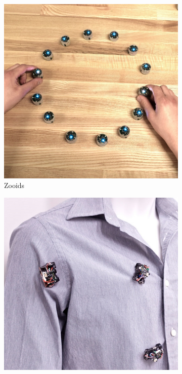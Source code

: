 \newpage

\begin{figure}
	\begin{subfigure}[b]{0.32\textwidth}
		\includegraphics[width=\textwidth]{pics/zooids.jpg}
		\caption{Zooids~\cite{legoc_uist_2016}}
		\label{fig:int_zooids}
	\end{subfigure}
	\begin{subfigure}[b]{0.324\textwidth}
		\includegraphics[width=\textwidth]{pics/rovables.jpg}

\end{subfigure}
\end{figure}
